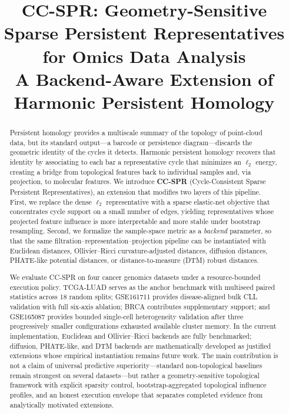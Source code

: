 \documentclass[11pt]{article}
\title{CC-SPR: Geometry-Sensitive Sparse Persistent Representatives\\for Omics Data Analysis\\[6pt]
\large A Backend-Aware Extension of Harmonic Persistent Homology}
\author{}
\date{}
\begin{document}
\maketitle

\begin{abstract}
Persistent homology provides a multiscale summary of the topology of point-cloud data, but its standard output---a barcode or persistence diagram---discards the geometric identity of the cycles it detects.
Harmonic persistent homology recovers that identity by associating to each bar a representative cycle that minimizes an $\ell_2$ energy, creating a bridge from topological features back to individual samples and, via projection, to molecular features.
We introduce \textbf{CC-SPR} (Cycle-Consistent Sparse Persistent Representatives), an extension that modifies two layers of this pipeline.
First, we replace the dense $\ell_2$ representative with a sparse elastic-net objective that concentrates cycle support on a small number of edges, yielding representatives whose projected feature influence is more interpretable and more stable under bootstrap resampling.
Second, we formalize the sample-space metric as a \emph{backend} parameter, so that the same filtration--representation--projection pipeline can be instantiated with Euclidean distances, Ollivier--Ricci curvature-adjusted distances, diffusion distances, PHATE-like potential distances, or distance-to-measure (DTM) robust distances.

We evaluate CC-SPR on four cancer genomics datasets under a resource-bounded execution policy.
TCGA-LUAD serves as the anchor benchmark with multiseed paired statistics across 18 random splits; GSE161711 provides disease-aligned bulk CLL validation with full six-axis ablation; BRCA contributes supplementary support; and GSE165087 provides bounded single-cell heterogeneity validation after three progressively smaller configurations exhausted available cluster memory.
In the current implementation, Euclidean and Ollivier--Ricci backends are fully benchmarked; diffusion, PHATE-like, and DTM backends are mathematically developed as justified extensions whose empirical instantiation remains future work.
The main contribution is not a claim of universal predictive superiority---standard non-topological baselines remain strongest on several datasets---but rather a geometry-sensitive topological framework with explicit sparsity control, bootstrap-aggregated topological influence profiles, and an honest execution envelope that separates completed evidence from analytically motivated extensions.
\end{abstract}
\end{document}
